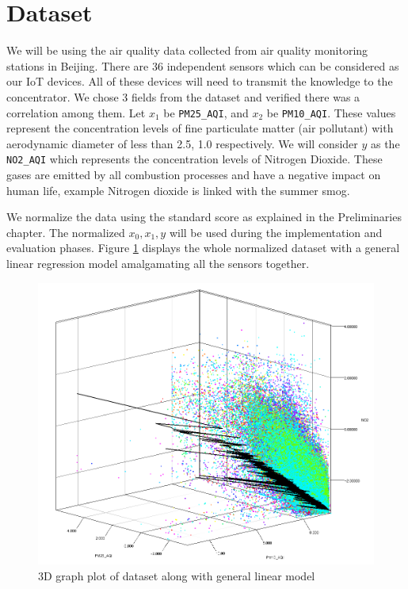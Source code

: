 \documentclass{mproj}
\begin{document}
\section{Dataset}
We will be using the air quality data \cite{air-quality-inference-meets-big-data} collected from air quality monitoring stations in Beijing. There are 36 independent sensors which can be considered as our IoT devices. All of these devices will need to transmit the knowledge to the concentrator. We chose 3 fields from the dataset and verified there was a correlation among them. Let $x_1$ be \texttt{PM25\_AQI}, and $x_2$ be \texttt{PM10\_AQI}. These values represent the concentration levels of fine particulate matter (air pollutant) with aerodynamic diameter of less than 2.5, 1.0 respectively. We will consider $y$ as the \texttt{NO2\_AQI} which represents the concentration levels of Nitrogen Dioxide. These gases are emitted by all combustion processes and have a negative impact on human life, example Nitrogen dioxide is linked with the summer smog. \cite{Richter2005}

We normalize the data using the standard score as explained in the Preliminaries chapter. The normalized $x_0,x_1,y$ will be used during the implementation and evaluation phases. Figure \ref{fig:dataset} displays the whole normalized dataset with a general linear regression model amalgamating all the sensors together.

\begin{figure}[H]
\caption{3D graph plot of dataset along with general linear model}
\label{fig:dataset}
\centerline{\includegraphics[scale=0.6]{dataset}}
\end{figure}
\end{document}
